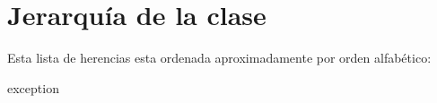 \section{Jerarquía de la clase}
Esta lista de herencias esta ordenada aproximadamente por orden alfabético\+:\begin{DoxyCompactList}
\item exception\begin{DoxyCompactList}
\item {}
\end{DoxyCompactList}
\item {}
\item {}
\end{DoxyCompactList}
